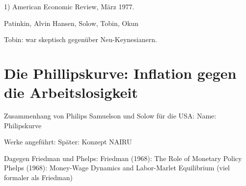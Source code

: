 1) American Economic Review, März 1977.

Patinkin, Alvin Hansen, Solow, Tobin, Okun

Tobin: war skeptisch gegenüber Neu-Keynesianern. \textcite[S. 398]{Snowdon2005}

\section{Die Phillipskurve: Inflation gegen die Arbeitslosigkeit} \label{sec: Phillips}

Zusammenhang von Philips
Samuelson und Solow für die USA: Name: Philipskurve



Werke angeführt: \parencite[S. 57]{Snowdon2005}
Später: Konzept NAIRU


Dagegen Friedman und Phelps:
Friedman (1968): The Role of Monetary Policy
Phelps (1968): Money-Wage Dynamics and Labor-Marlet Equilibrium (viel formaler als Friedman)



